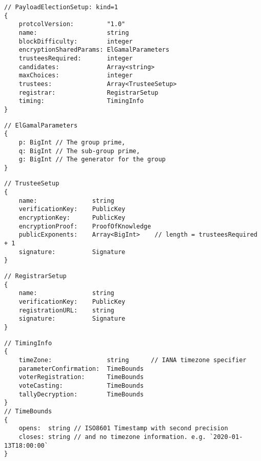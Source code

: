 \label{dt:payload:setup}
\begin{lstlisting}[style=ES6]
// PayloadElectionSetup: kind=1
{
    protcolVersion:         "1.0"
    name:                   string
    blockDifficulty:        integer
    encryptionSharedParams: ElGamalParameters
    trusteesRequired:       integer
    candidates:             Array<string>
    maxChoices:             integer
    trustees:               Array<TrusteeSetup>
    registrar:              RegistrarSetup
    timing:                 TimingInfo
}
\end{lstlisting}
\vspace*{-0.95em}
\label{dt:elgamal:params}
\begin{lstlisting}[style=ES6, firstnumber=last]
// ElGamalParameters
{
    p: BigInt // The group prime,
    q: BigInt // The sub-group prime,
    g: BigInt // The generator for the group
}
\end{lstlisting}
\vspace*{-0.95em}
\label{dt:trustee}
\begin{lstlisting}[style=ES6, firstnumber=last]
// TrusteeSetup
{
    name:               string
    verificationKey:    PublicKey
    encryptionKey:      PublicKey
    encryptionProof:    ProofOfKnowledge
    publicExponents:    Array<BigInt>    // length = trusteesRequired + 1
    signature:          Signature
}
\end{lstlisting}
\vspace*{-0.95em}
\label{dt:registrar}
\begin{lstlisting}[style=ES6, firstnumber=last]
// RegistrarSetup
{
    name:               string
    verificationKey:    PublicKey
    registrationURL:    string
    signature:          Signature
}
\end{lstlisting}
\vspace*{-0.95em}
\label{dt:timing}
\begin{lstlisting}[style=ES6, firstnumber=last]
// TimingInfo
{
    timeZone:               string      // IANA timezone specifier
    parameterConfirmation:  TimeBounds
    voterRegistration:      TimeBounds
    voteCasting:            TimeBounds
    tallyDecryption:        TimeBounds
}
// TimeBounds
{
    opens:  string // ISO8601 Timestamp with second precision
    closes: string // and no timezone information. e.g. `2020-01-13T18:00:00`
}
\end{lstlisting}

